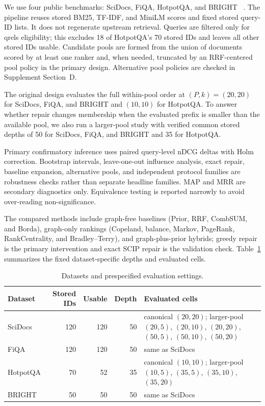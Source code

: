 \documentclass[acmsmall,anonymous,review]{acmart}
\begin{document}
We use four public benchmarks: SciDocs, FiQA, HotpotQA, and BRIGHT
~\cite{cohan2020scidocs,maia2018fiqa,yang2018hotpotqa,su2024bright}. The
pipeline reuses stored BM25, TF-IDF, and MiniLM scores and fixed stored
query-ID lists. It does not regenerate upstream retrieval. Queries are
filtered only for qrels eligibility; this excludes 18 of HotpotQA's 70
stored IDs and leaves all other stored IDs usable. Candidate pools are
formed from the union of documents scored by at least one ranker and, when
needed, truncated by an RRF-centered pool policy in the primary design.
Alternative pool policies are checked in Supplement Section~D.

The original design evaluates the full within-pool order at $(P,k)=(20,20)$
for SciDocs, FiQA, and BRIGHT and $(10,10)$ for HotpotQA. To answer whether
repair changes membership when the evaluated prefix is smaller than the
available pool, we also run a larger-pool study with verified common stored
depths of 50 for SciDocs, FiQA, and BRIGHT and 35 for HotpotQA.

Primary confirmatory inference uses paired query-level nDCG deltas with
Holm correction. Bootstrap intervals, leave-one-out influence analysis,
exact repair, baseline expansion, alternative pools, and independent
protocol families are robustness checks rather than separate headline
families. MAP and MRR are secondary diagnostics only. Equivalence testing is
reported narrowly to avoid over-reading non-significance.

The compared methods include graph-free baselines (Prior, RRF, CombSUM, and
Borda), graph-only rankings (Copeland, balance, Markov, PageRank,
RankCentrality, and Bradley--Terry), and graph-plus-prior hybrids; greedy
repair is the primary intervention and exact SCIP repair is the validation
check. Table~\ref{tab:setup} summarizes the fixed dataset-specific depths
and evaluated cells.

\begin{table}[t]
  \caption{Datasets and prespecified evaluation settings.}
  \label{tab:setup}
  \scriptsize
  \begin{tabular}{lrrrp{3.6cm}}
    \toprule
    Dataset & Stored IDs & Usable & Depth & Evaluated cells \\
    \midrule
    SciDocs & 120 & 120 & 50 & canonical $(20,20)$; larger-pool $(20,5)$, $(20,10)$, $(20,20)$, $(50,5)$, $(50,10)$, $(50,20)$ \\
    FiQA & 120 & 120 & 50 & same as SciDocs \\
    HotpotQA & 70 & 52 & 35 & canonical $(10,10)$; larger-pool $(10,5)$, $(35,5)$, $(35,10)$, $(35,20)$ \\
    BRIGHT & 50 & 50 & 50 & same as SciDocs \\
    \bottomrule
  \end{tabular}
\end{table}
\end{document}
